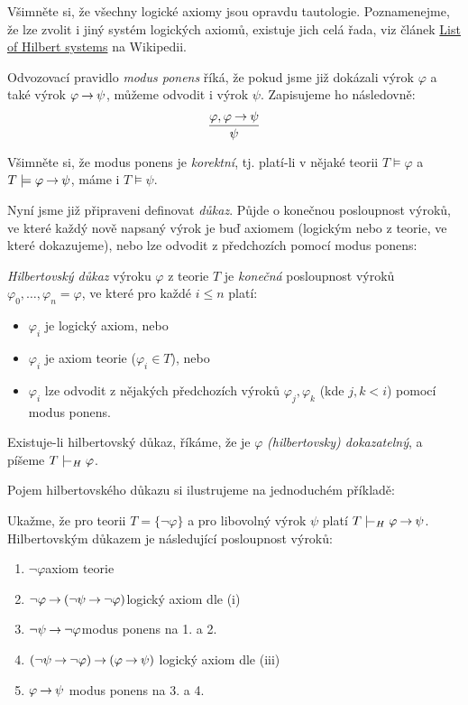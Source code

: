 Všimněte si, že všechny logické axiomy jsou opravdu tautologie. Poznamenejme, že lze zvolit i jiný systém logických axiomů, existuje jich celá řada, viz článek \href{https://en.wikipedia.org/wiki/List_of_Hilbert_systems}{List of Hilbert systems} na Wikipedii.

\begin{definition}
Odvozovací pravidlo \emph{modus ponens} říká, že pokud jsme již dokázali výrok $\varphi$ a také výrok $\varphi\mathbin{\rightarrow}\psi$, můžeme odvodit i výrok $\psi$. Zapisujeme ho následovně:
$$
\frac{\varphi, \varphi \mathbin{\rightarrow} \psi}{\psi}
$$
\end{definition}

Všimněte si, že modus ponens je \emph{korektní}, tj. platí-li v nějaké teorii $T\models\varphi$ a $T\models\varphi\mathbin{\rightarrow}\psi$, máme i $T\models\psi$.

Nyní jsme již připraveni definovat \emph{důkaz}. Půjde o konečnou posloupnost výroků, ve které každý nově napsaný výrok je buď axiomem (logickým nebo z teorie, ve které dokazujeme), nebo lze odvodit z předchozích pomocí modus ponens:

\begin{definition}
    \emph{Hilbertovský důkaz} výroku $\varphi$ z teorie $T$ je \emph{konečná} posloupnost výroků $\varphi_0, \dots, \varphi_n=\varphi$, ve které pro každé $i\le n$ platí:
    \begin{itemize}
    \item $\varphi_i$ je logický axiom, nebo
    \item $\varphi_i$ je axiom teorie ($\varphi_i \in T$), nebo
    \item $\varphi_i$ lze odvodit z nějakých předchozích výroků $\varphi_j,\varphi_k$ (kde $j,k<i$) pomocí modus ponens.
    \end{itemize}
    Existuje-li hilbertovský důkaz, říkáme, že je $\varphi$ \emph{(hilbertovsky) dokazatelný}, a píšeme $T\proves_H\varphi$.
\end{definition}

Pojem hilbertovského důkazu si ilustrujeme na jednoduchém příkladě:

\begin{example}
Ukažme, že pro teorii $T=\{\neg\varphi\}$ a pro libovolný výrok $\psi$ platí $T\proves_H\varphi\limplies\psi$. Hilbertovským důkazem je následující posloupnost výroků:
\begin{enumerate}\it
    \item $\neg\varphi$\hfill axiom teorie
    \item $\neg \varphi \mathbin{\rightarrow} (\neg \psi \mathbin{\rightarrow} \neg \varphi)$\hfill logický axiom dle (i)
    \item $\neg \psi \mathbin{\rightarrow} \neg \varphi$\hfill modus ponens na 1. a 2.
    \item $(\neg \psi \mathbin{\rightarrow} \neg \varphi)\mathbin{\rightarrow}(\varphi \mathbin{\rightarrow} \psi)$ \hfill logický axiom dle (iii)
    \item $\varphi \mathbin{\rightarrow} \psi$ \hfill modus ponens na 3. a 4.
\end{enumerate}
\end{example}

